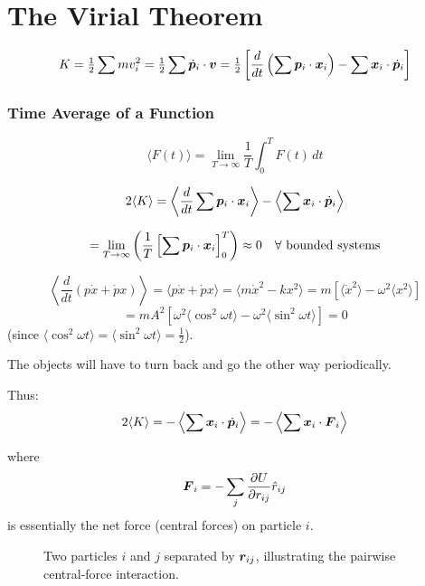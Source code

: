 
\chapter{The Virial Theorem}

\[
    K = \tfrac{1}{2}\sum m v_i^2 = \tfrac{1}{2}\sum \dot{\bm{p}}_i \cdot \bm{v}
    = \tfrac{1}{2}\left[\frac{d}{dt}\left(\sum \bm{p}_i \cdot \bm{x}_i\right) - \sum \bm{x}_i \cdot \dot{\bm{p}}_i\right]
\]

\subsection{Time Average of a Function}

\[
    \langle F(t)\rangle = \lim_{T\to\infty}\frac{1}{T}\int_0^T F(t)\,dt
\]

\[
    2\langle K\rangle = \left\langle \frac{d}{dt}\sum \bm{p}_i\cdot\bm{x}_i\right\rangle
    - \left\langle \sum \bm{x}_i\cdot\dot{\bm{p}}_i\right\rangle
\]

\[
    = \lim_{T\to\infty}\left(\frac{1}{T}\left[\sum \bm{p}_i\cdot\bm{x}_i\right]_0^T\right) \approx 0
    \quad\forall\text{ bounded systems}
\]

\begin{example}[1D SHO]
\[
    \left\langle \frac{d}{dt}(p\dot x + \dot p x)\right\rangle = \langle p\dot x + \dot p x\rangle
    = \langle m\dot x^2 - kx^2\rangle
    = m\left[\langle\dot x^2\rangle - \omega^2\langle x^2\rangle\right]
\]
\[
    = mA^2\left[\omega^2\langle\cos^2\omega t\rangle - \omega^2\langle\sin^2\omega t\rangle\right] = 0
\]
(since $\langle\cos^2\omega t\rangle = \langle\sin^2\omega t\rangle = \tfrac{1}{2}$).
\end{example}

The objects will have to turn back and go the other way periodically.

Thus:
\[
    2\langle K\rangle = -\left\langle\sum \lvect{x}_i\cdot\dot{\lvect{p}}_i\right\rangle
    = -\left\langle\sum \lvect{x}_i\cdot\vect{F}_i\right\rangle
\]

where
\[
    \vect{F}_i = -\sum_j \frac{\partial U}{\partial r_{ij}}\hat{r}_{ij}
\]
is essentially the net force (central forces) on particle $i$.

\begin{figure}[H]
\centering
\caption{Two particles $i$ and $j$ separated by $\bm{r}_{ij}$, illustrating the pairwise central-force interaction.}
\end{figure}

